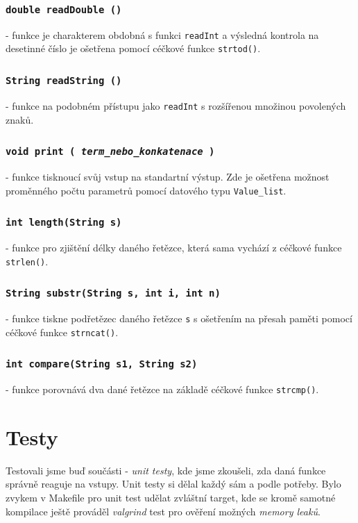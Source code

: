 \documentclass[a4paper,11pt]{article}
\begin{document}
\subsubsection {\texttt{double readDouble ()}} - funkce je charakterem obdobná s funkci \texttt{readInt} a výsledná kontrola na desetinné číslo je ošetřena pomocí céčkové funkce \texttt{strtod()}.
\subsubsection {\texttt{String readString ()}} - funkce na podobném přístupu jako \texttt{readInt} s rozšířenou množinou povolených znaků.
\subsubsection {\texttt{void print ( \emph{term\_nebo\_konkatenace} )}} - funkce tisknoucí svůj vstup na standartní výstup. Zde je ošetřena možnost proměnného počtu parametrů pomocí datového typu \texttt{Value\_list}. 
\subsubsection {\texttt{int length(String s)}} - funkce pro zjištění délky daného řetězce, která sama vychází z céčkové funkce \texttt{strlen()}.
\subsubsection {\texttt{String substr(String s, int i, int n)}} - funkce tiskne podřetězec daného řetězce \texttt{s} s ošetřením na přesah paměti pomocí céčkové funkce \texttt{strncat()}.
\subsubsection {\texttt{int compare(String s1, String s2)}} - funkce porovnává dva dané řetězce na základě céčkové funkce \texttt{strcmp()}.


\section{Testy}
Testovali jsme buď součásti - \textit{unit testy}, kde jsme zkoušeli, zda daná funkce správně reaguje na vstupy. Unit testy si dělal každý sám a podle potřeby. Bylo zvykem v Makefile pro unit test udělat zvláštní target, kde se kromě samotné kompilace ještě prováděl \textit{valgrind} test pro ověření možných \textit{memory leaků}. 
\end{document}

